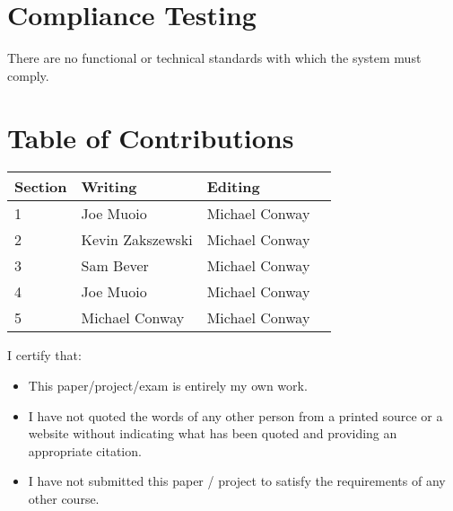\documentclass{article}
\begin{document}
\newpage

\section{Compliance Testing}

There are no functional or technical standards with which the system must
comply.

\newpage
\section*{\centering Table of Contributions}
\begin{tabular}{| l | l | l | l |}
    \hline
     Section & Writing & Editing \\
    \hline \hline
		1 & Joe Muoio & Michael Conway \\ \hline
		2 & Kevin Zakszewski & Michael Conway \\ \hline
		3 & Sam Bever & Michael Conway \\ \hline
		4 & Joe Muoio & Michael Conway \\ \hline
		5 & Michael Conway & Michael Conway \\ \hline
\end{tabular}
\newpage
\noindent I certify that:
\begin{itemize}
\item This paper/project/exam is entirely my own work.
\item I have not quoted the words of any other person from a printed source or a website without indicating what has been quoted and providing an appropriate citation.
\item I have not submitted this paper / project to satisfy the requirements of any other course.
\end{itemize}

\vspace{1cm}
\noindent{}


\vspace{0.5cm}
\noindent{}
\end{document}
